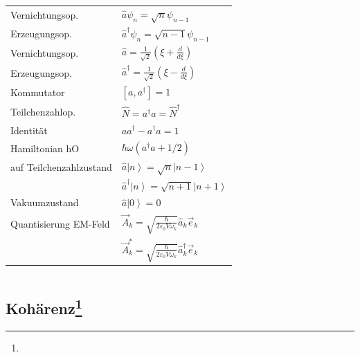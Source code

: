 \documentclass[12pt,a4paper]{article}
\renewcommand{\d}[2]{\frac{d #1}{d #2}}
\newcommand{\ket}[1]{\left| #1 \right>}
\renewcommand{\=}[1]{\stackrel{#1}{=}}
\theoremstyle{definition}
\theoremstyle{remark}
\begin{document}
\begin{center}
\begin{minipage}[t]{.49\linewidth}
\vspace{0pt}
\noindent\begin{tabular}{ll}
Vernichtungsop. & $\hat a \psi_n = \sqrt n \psi_{n-1}$\\
Erzeugungsop. & $\hat a^\dagger \psi_n = \sqrt{n-1} \psi_{n-1}$\\
Vernichtungsop. & $\hat a = \frac{1}{\sqrt{2}} (\xi + \d{}{\xi})$\\
Erzeugungsop. & $\hat a^\dagger = \frac{1}{\sqrt{2}} (\xi - \d{}{\xi})$\\
Kommutator & $[a, a^\dagger] = 1$\\
Teilchenzahlop. & $\hat N = a^\dagger a = \hat N^\dagger$\\
Identität & $a a^\dagger - a^\dagger a = 1$\\
Hamiltonian hO & $\hbar \omega (a^\dagger a + 1/2)$\\
auf Teilchenzahlzustand & $\hat a \ket n = \sqrt{n} \ket{n-1}$\\
 & $\hat a^\dagger \ket n = \sqrt{n+1} \ket{n+1}$\\
Vakuumzustand & $\hat a \ket 0 = 0$\\
Quantisierung EM-Feld & $\vec A_k = \sqrt{\frac{\hbar}{2 \varepsilon_0 V \omega_k}} \hat a_k \vec e_k$\\
 & $\vec A_k^* = \sqrt{\frac{\hbar}{2 \varepsilon_0 V \omega_k}} \hat a_k^\dagger \vec e_k$\\
\end{tabular}
\end{minipage}%
\begin{minipage}[t]{.49\linewidth}
\vspace{0pt}
\begin{tabular}{ll}

\end{tabular}
\end{minipage}
\end{center}


\subsection[Kohärenz]{Kohärenz\let\thefootnote\relax\footnote{}}
\end{document}
